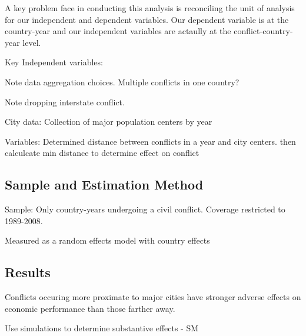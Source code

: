 A key problem face in conducting this analysis is reconciling the unit of analysis for our independent and dependent variables. Our dependent variable is at the country-year and our independent variables are actaully at the conflict-country-year level. 


Key Independent variables: 

		Note data aggregation choices.  Multiple conflicts in one country?

		Note dropping interstate conflict.

	City data: Collection of major population centers by year 

	Variables: Determined distance between conflicts in a year and city centers. then calculcate min distance to determine effect on conflict 

\subsection{Sample and Estimation Method}

Sample: Only country-years undergoing a civil conflict. Coverage restricted to 1989-2008. 

Measured as a random effects model with country effects 

\subsection{Results} 

Conflicts occuring more proximate to major cities have stronger adverse effects on economic performance than those farther away. 

\begin{figure}[ht]
	\centering
	\resizebox{.6\textwidth}{!}{}
\end{figure}
\FloatBarrier

Use simulations to determine substantive effects - SM

\begin{figure}[ht]
	\centering
	\resizebox{.8\textwidth}{!}{}
\end{figure}
\FloatBarrier